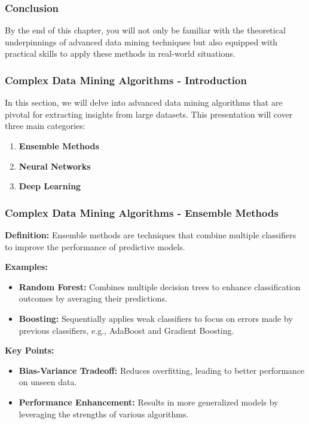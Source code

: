 \documentclass{beamer}
\begin{document}
\begin{frame}[fragile]
    \frametitle{Conclusion}
    By the end of this chapter, you will not only be familiar with the theoretical underpinnings of advanced data mining techniques but also equipped with practical skills to apply these methods in real-world situations.
\end{frame}

\begin{frame}[fragile]
    \frametitle{Complex Data Mining Algorithms - Introduction}
    In this section, we will delve into advanced data mining algorithms that are pivotal for extracting insights from large datasets. 
    This presentation will cover three main categories:
    
    \begin{enumerate}
        \item \textbf{Ensemble Methods}
        \item \textbf{Neural Networks}
        \item \textbf{Deep Learning}
    \end{enumerate}
\end{frame}

\begin{frame}[fragile]
    \frametitle{Complex Data Mining Algorithms - Ensemble Methods}
    \textbf{Definition:} Ensemble methods are techniques that combine multiple classifiers to improve the performance of predictive models.

    \textbf{Examples:}
    \begin{itemize}
        \item \textbf{Random Forest:} Combines multiple decision trees to enhance classification outcomes by averaging their predictions.
        \item \textbf{Boosting:} Sequentially applies weak classifiers to focus on errors made by previous classifiers, e.g., AdaBoost and Gradient Boosting.
    \end{itemize}
    
    \textbf{Key Points:}
    \begin{itemize}
        \item \textbf{Bias-Variance Tradeoff:} Reduces overfitting, leading to better performance on unseen data.
        \item \textbf{Performance Enhancement:} Results in more generalized models by leveraging the strengths of various algorithms.
    \end{itemize}
\end{frame}
\end{document}
